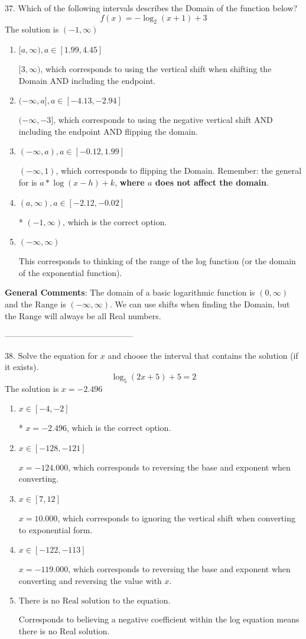 \documentclass{extbook}[14pt]
\begin{document}
37. Which of the following intervals describes the Domain of the function below?
\[ f(x) = -\log_2{(x+1)}+3 \] 
The solution is $ (-1, \infty) $ 

\begin{enumerate}[label=\Alph*.] 
\item $ [a, \infty), a \in [1.99, 4.45] $ 

 $[3, \infty)$, which corresponds to using the vertical shift when shifting the Domain AND including the endpoint. 
\item $ (-\infty, a], a \in [-4.13, -2.94] $ 

 $(-\infty, -3]$, which corresponds to using the negative vertical shift AND including the endpoint AND flipping the domain. 
\item $ (-\infty, a), a \in [-0.12, 1.99] $ 

 $(-\infty, 1)$, which corresponds to flipping the Domain. Remember: the general for is $a*\log(x-h)+k$, \textbf{where $a$ does not affect the domain}. 
\item $ (a, \infty), a \in [-2.12, -0.02] $ 

 * $(-1, \infty)$, which is the correct option. 
\item $ (-\infty, \infty) $ 

 This corresponds to thinking of the range of the log function (or the domain of the exponential function). 
\end{enumerate} 
 
\textbf{General Comments}: The domain of a basic logarithmic function is $(0, \infty)$ and the Range is $(-\infty, \infty)$. We can use shifts when finding the Domain, but the Range will always be all Real numbers.

-----------------------------------------------

38. Solve the equation for $x$ and choose the interval that contains the solution (if it exists).
\[ \log_{5}{(2x+5)}+5 = 2 \] 
The solution is $ x = -2.496 $ 

\begin{enumerate}[label=\Alph*.] 
\item $ x \in [-4, -2] $ 

 * $x = -2.496$, which is the correct option. 
\item $ x \in [-128, -121] $ 

 $x = -124.000$, which corresponds to reversing the base and exponent when converting. 
\item $ x \in [7, 12] $ 

 $x = 10.000$, which corresponds to ignoring the vertical shift when converting to exponential form. 
\item $ x \in [-122, -113] $ 

 $x = -119.000$, which corresponds to reversing the base and exponent when converting and reversing the value with $x$. 
\item $ \text{There is no Real solution to the equation.} $ 

 Corresponds to believing a negative coefficient within the log equation means there is no Real solution. 
\end{enumerate} 
 
\end{document}
